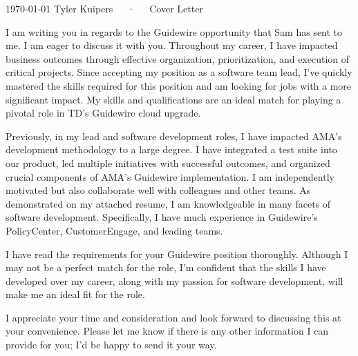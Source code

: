 \documentclass[11pt, a4paper]{awesome-cv}
\begin{document}
\makecvheader[R]

\makecvfooter
  {\today}
  {Tyler Kuipers~~~·~~~Cover Letter}
  {\thepage}

\makelettertitle


\begin{cvletter}
I am writing you in regards to the Guidewire opportunity that Sam has sent to me.  I am eager to discuss it with you.
Throughout my career, I have impacted business outcomes through effective organization, prioritization, and execution of critical
projects. Since accepting my position as a software team lead, I’ve quickly mastered the skills required for this position and am
looking for jobs with a more significant impact. My skills and qualifications are an ideal match for playing a pivotal role in TD’s Guidewire
cloud upgrade.

Previously, in my lead and software development roles, I have impacted AMA’s development methodology to a large degree. I
have integrated a test suite into our product, led multiple initiatives with successful outcomes, and organized crucial components
of AMA’s Guidewire implementation. I am independently motivated but also collaborate well with colleagues and other teams. As
demonstrated on my attached resume, I am knowledgeable in many facets of software development. Specifically, I have much
experience in Guidewire’s PolicyCenter, CustomerEngage, and leading teams.

I have read the requirements for your Guidewire position thoroughly. Although I may not be a perfect match for the role, I’m
confident that the skills I have developed over my career, along with my passion for software development, will make me an ideal
fit for the role.

I appreciate your time and consideration and look forward to discussing this at your convenience. Please let me know if there is
any other information I can provide for you; I’d be happy to send it your way.

\end{cvletter}

\makeletterclosing



\end{document}
